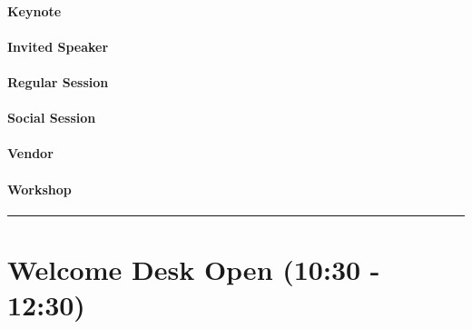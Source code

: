 \documentclass[
]{book}
\begin{document}
\begin{keynote}
\hypertarget{keynote}{%
\paragraph{Keynote}\label{keynote}}
\end{keynote}

\begin{speaker}
\hypertarget{invited-speaker}{%
\paragraph{Invited Speaker}\label{invited-speaker}}
\end{speaker}

\begin{session}
\hypertarget{regular-session}{%
\paragraph{Regular Session}\label{regular-session}}
\end{session}
\begin{social}
\hypertarget{social-session}{%
\paragraph{Social Session}\label{social-session}}
\end{social}
\begin{vendor}
\hypertarget{vendor}{%
\paragraph{Vendor}\label{vendor}}
\end{vendor}

\begin{workshop}
\hypertarget{workshop}{%
\paragraph{Workshop}\label{workshop}}
\end{workshop}

\begin{center}\rule{0.5\linewidth}{0.5pt}\end{center}

\hypertarget{welcome-desk-open-1030---1230}{%
\section*{Welcome Desk Open (10:30 - 12:30)}\label{welcome-desk-open-1030---1230}}
\end{document}
